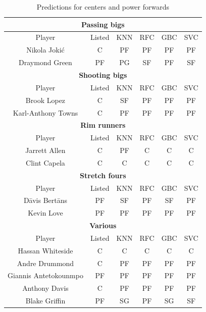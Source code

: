 \documentclass[a4paper]{article}
\begin{document}
\begin{table}[!h]
\begin{center}
\begin{tabular}{|c|c|c|c|c|c|} \hline
\multicolumn{6}{|c|}{\textbf{Passing bigs}} \\ \hline
Player & Listed & KNN & RFC & GBC & SVC \\ \hline
Nikola Jokić & C & PF & PF & PF & PF \\ \hline
Draymond Green & PF & PG & SF & PF & SF \\ \hline
\multicolumn{6}{|c|}{\textbf{Shooting bigs}} \\ \hline
Player & Listed & KNN & RFC & GBC & SVC \\ \hline
Brook Lopez & C & SF & PF  & PF & PF \\ \hline
Karl-Anthony Towns & C & PF  & PF & PF & PF  \\ \hline
\multicolumn{6}{|c|}{\textbf{Rim runners}} \\ \hline
Player & Listed & KNN & RFC & GBC & SVC \\ \hline
Jarrett Allen & C & PF & C & C & C  \\ \hline
Clint Capela & C & C & C & C & C \\ \hline
\multicolumn{6}{|c|}{\textbf{Stretch fours}} \\ \hline
Player & Listed & KNN & RFC & GBC & SVC \\ \hline
Dāvis Bertāns & PF & SF & PF & SF & PF \\ \hline
Kevin Love & PF & PF & PF & PF & PF \\ \hline
\multicolumn{6}{|c|}{\textbf{Various}} \\ \hline
Player & Listed & KNN & RFC & GBC & SVC \\ \hline
Hassan Whiteside & C & C & C & C & C \\ \hline
Andre Drummond & C & PF & PF & PF & PF \\ \hline
Giannis Antetokounmpo & PF & PF & PF & PF & PF \\ \hline
Anthony Davis & C & PF & PF & PF & PF \\ \hline
Blake Griffin & PF & SG & PF & SG & SF \\ \hline
\end{tabular}
\caption{Predictions for centers and power forwards}
\label{tab:pos_clf_c_pf_predictions}
\end{center}
\end{table}
\end{document}
